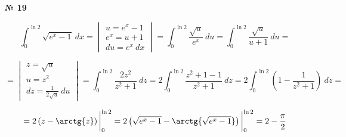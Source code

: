 \documentclass{article}
\begin{document}
\textbf{№ 19} 
\large

$$ \int_{0}^{\ln{2}} \sqrt{e^x - 1} \ dx 
= \begin{vmatrix} u = e^x - 1 \\
                  e^x = u + 1 \\
                  du = e^x \ dx \end{vmatrix}
= \int_{0}^{\ln{2}} \frac{\sqrt{u}}{e^x} \ du 
= \int_{0}^{\ln{2}} \frac{\sqrt{u}}{u+1} \ du  
= $$

$$ = \begin{vmatrix} z = \sqrt{u} \\
                     u = z^2 \\
                    dz = \frac{1}{2\sqrt{u}} \ du \end{vmatrix}
= \int_{0}^{\ln{2}} \frac{2z^2}{z^2+1} \ dz
= 2 \int_{0}^{\ln{2}} \frac{z^2+1-1}{z^2+1} \ dz 
= 2 \int_{0}^{\ln{2}} \left( 1 - \frac{1}{z^2+1} \right) \ dz 
= $$

$$ = 2 \left( z - \arctg{z} \right) \bigg\vert_{0}^{\ln{2}}
= 2 \left( \sqrt{e^x - 1} - \arctg{\sqrt{e^x - 1}} \right) \bigg\vert_{0}^{\ln{2}}
= 2 - \frac{\pi}{2}$$
\end{document}
